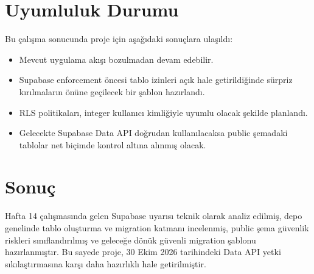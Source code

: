 \documentclass[12pt,a4paper]{article}
\begin{document}
\section{Uyumluluk Durumu}

Bu çalışma sonucunda proje için aşağıdaki sonuçlara ulaşıldı:

\begin{itemize}[leftmargin=2em, itemsep=4pt]
	\item Mevcut uygulama akışı bozulmadan devam edebilir.
	\item Supabase enforcement öncesi tablo izinleri açık hale getirildiğinde sürpriz kırılmaların önüne geçilecek bir şablon hazırlandı.
	\item RLS politikaları, integer kullanıcı kimliğiyle uyumlu olacak şekilde planlandı.
	\item Gelecekte Supabase Data API doğrudan kullanılacaksa public şemadaki tablolar net biçimde kontrol altına alınmış olacak.
\end{itemize}

\section{Sonuç}

Hafta 14 çalışmasında gelen Supabase uyarısı teknik olarak analiz edilmiş, depo genelinde tablo oluşturma ve migration katmanı incelenmiş, public şema güvenlik riskleri sınıflandırılmış ve geleceğe dönük güvenli migration şablonu hazırlanmıştır. Bu sayede proje, 30 Ekim 2026 tarihindeki Data API yetki sıkılaştırmasına karşı daha hazırlıklı hale getirilmiştir.
\end{document}
